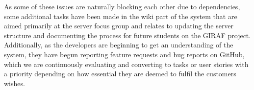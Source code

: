 \noindent As some of these issues are naturally blocking each other due to dependencies, some additional tasks have been made in the wiki part of the system that are aimed primarily at the server focus group and relates to updating the server structure and documenting the process for future students on the GIRAF project.
Additionally, as the developers are beginning to get an understanding of the system, they have begun reporting feature requests and bug reports on GitHub, which we are continuously evaluating and converting to tasks or user stories with a priority depending on how essential they are deemed to fulfil the customers wishes.
